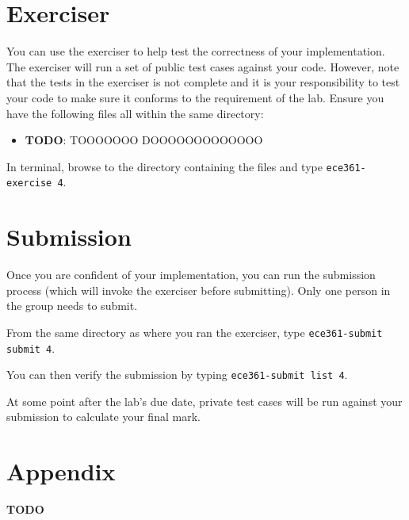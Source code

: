 \documentclass[11pt]{article}
\def\thelab{4}
\begin{document}
\section{Exerciser}
\label{sec:exercise}
You can use the exerciser to help test the correctness of your implementation.
The exerciser will run a set of public test cases against your code.
However, note that the tests in the exerciser is not complete and it is your responsibility to test your code to make sure it conforms to the requirement of the lab.
Ensure you have the following files all within the same directory:
\begin{itemize}
    \item \textbf{TODO}: TOOOOOOO DOOOOOOOOOOOOO
\end{itemize}

In terminal, browse to the directory containing the files and type \texttt{ece361-exercise \thelab}.

\section{Submission}
\label{sec:submission}
Once you are confident of your implementation, you can run the submission process (which will invoke the exerciser before submitting).
Only one person in the group needs to submit.

From the same directory as where you ran the exerciser, type \texttt{ece361-submit submit \thelab}.

You can then verify the submission by typing \texttt{ece361-submit list \thelab}.

At some point after the lab's due date, private test cases will be run against your submission to calculate your final mark.

\newpage
\appendix
\section{Appendix}
\label{sec:appendix}
\textbf{TODO}
\end{document}

